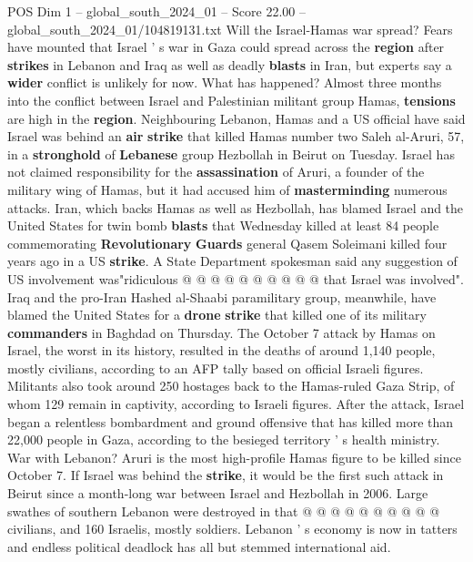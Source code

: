 \begin{textsample}{POS Dim 1 – global\_south\_2024\_01 – Score 22.00 – global\_south\_2024\_01/104819131.txt}  \label{ex:f1_pos_108}
Will the Israel-Hamas war spread?
Fears have mounted that Israel ' s war in Gaza could spread across the \textbf{region} after \textbf{strikes} in Lebanon and Iraq as well as deadly \textbf{blasts} in Iran, but experts say a \textbf{wider} conflict is unlikely for now.
What has happened?
Almost three months into the conflict between Israel and Palestinian militant group Hamas, \textbf{tensions} are high in the \textbf{region}.
Neighbouring Lebanon, Hamas and a US official have said Israel was behind an \textbf{air} \textbf{strike} that killed Hamas number two Saleh al-Aruri, 57, in a \textbf{stronghold} of \textbf{Lebanese} group Hezbollah in Beirut on Tuesday.
Israel has not claimed responsibility for the \textbf{assassination} of Aruri, a founder of the military wing of Hamas, but it had accused him of \textbf{masterminding} numerous attacks.
Iran, which backs Hamas as well as Hezbollah, has blamed Israel and the United States for twin bomb \textbf{blasts} that Wednesday killed at least 84 people commemorating \textbf{Revolutionary} \textbf{Guards} general Qasem Soleimani killed four years ago in a US \textbf{strike}.
A State Department spokesman said any suggestion of US involvement was"ridiculous @ @ @ @ @ @ @ @ @ @ that Israel was involved".
Iraq and the pro-Iran Hashed al-Shaabi paramilitary group, meanwhile, have blamed the United States for a \textbf{drone} \textbf{strike} that killed one of its military \textbf{commanders} in Baghdad on Thursday.
The October 7 attack by Hamas on Israel, the worst in its history, resulted in the deaths of around 1,140 people, mostly civilians, according to an AFP tally based on official Israeli figures.
Militants also took around 250 hostages back to the Hamas-ruled Gaza Strip, of whom 129 remain in captivity, according to Israeli figures.
After the attack, Israel began a relentless bombardment and ground offensive that has killed more than 22,000 people in Gaza, according to the besieged territory ' s health ministry.
War with Lebanon?
Aruri is the most high-profile Hamas figure to be killed since October 7.
If Israel was behind the \textbf{strike}, it would be the first such attack in Beirut since a month-long war between Israel and Hezbollah in 2006.
Large swathes of southern Lebanon were destroyed in that @ @ @ @ @ @ @ @ @ @ civilians, and 160 Israelis, mostly soldiers.
Lebanon ' s economy is now in tatters and endless political deadlock has all but stemmed international aid.

\end{textsample}

